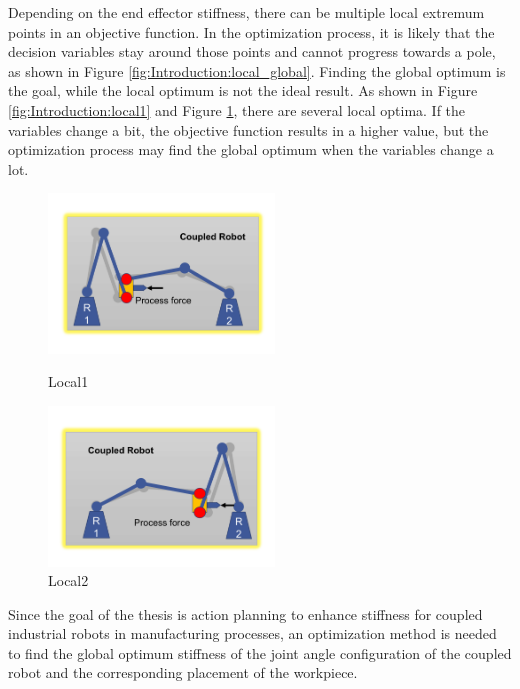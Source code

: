 Depending on the end effector stiffness, there can be multiple local extremum points in an objective function. In the optimization process, it is likely that the decision variables stay around those points and cannot progress towards a pole, as shown in Figure \ref{fig:Introduction:local_global}. Finding the global optimum is the goal, while the local optimum is not the ideal result. As shown in Figure \ref{fig:Introduction:local1} and Figure \ref{fig:Introduction:local2}, there are several local optima. If the variables change a bit, the objective function results in a higher value, but the optimization process may find the global optimum when the variables change a lot.\par
\begin{figure}[h!]
\centering
\vspace{-0.7cm}
\setlength{\abovecaptionskip}{-0.3cm} 
\begin{minipage}[t]{0.48\textwidth}
\centering
\includegraphics[width=6cm]{03_images/local1.pdf}
\caption{Local1}
\label{fig:Introduction:local1}
\end{minipage}
\begin{minipage}[t]{0.48\textwidth}
\centering
\includegraphics[width=6cm]{03_images/local2.pdf}
\caption{Local2}
\label{fig:Introduction:local2}
\end{minipage}
\vspace{-0.5cm}
\end{figure}
Since the goal of the thesis is action planning to enhance stiffness for coupled industrial robots in manufacturing processes, an optimization method is needed to find the global optimum stiffness of the joint angle configuration of the coupled robot and the corresponding placement of the workpiece.\par

